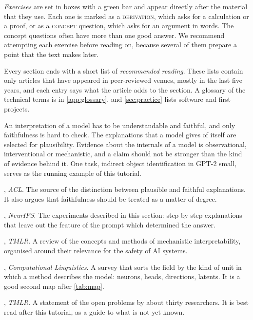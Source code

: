 \emph{Exercises} are set in boxes with a green bar and appear directly after the material that they use. Each one
is marked as a \textsc{derivation}, which asks for a calculation or a proof, or as a \textsc{concept} question,
which asks for an argument in words. The concept questions often have more than one good answer. We recommend
attempting each exercise before reading on, because several of them prepare a point that the text makes later.

Every section ends with a short list of \emph{recommended reading}. These lists contain only articles that have
appeared in peer-reviewed venues, mostly in the last five years, and each entry says what the
article adds to the section. A glossary of the technical terms is in \cref{app:glossary}, and
\cref{sec:practice} lists software and first projects.

\begin{takeaways}
An interpretation of a model has to be understandable and faithful, and only faithfulness is hard to check. The
explanations that a model gives of itself are selected for plausibility. Evidence about the internals of a model
is observational, interventional or mechanistic, and a claim should not be stronger than the kind of evidence
behind it. One task, indirect object identification in GPT-2 small, serves as the running example of this
tutorial.
\end{takeaways}

\begin{readinglist}
\item \citet{jacovi2020towards}, \emph{ACL}. The source of the distinction between plausible and faithful
explanations. It also argues that faithfulness should be treated as a matter of degree.
\item \citet{turpin2023language}, \emph{NeurIPS}. The experiments described in this section: step-by-step
explanations that leave out the feature of the prompt which determined the answer.
\item \citet{bereska2024mechanistic}, \emph{TMLR}. A review of the concepts and methods of mechanistic
interpretability, organised around their relevance for the safety of AI systems.
\item \citet{mueller2026quest}, \emph{Computational Linguistics}. A survey that sorts the field by the kind of
unit in which a method describes the model: neurons, heads, directions, latents. It is a good second map after
\cref{tab:map}.
\item \citet{sharkey2025open}, \emph{TMLR}. A statement of the open problems by about thirty researchers. It is
best read after this tutorial, as a guide to what is not yet known.
\end{readinglist}

